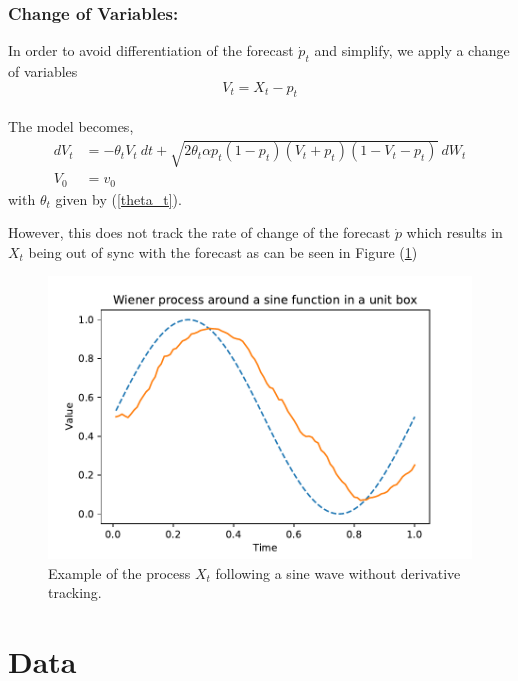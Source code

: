 \documentclass[10pt,twocolumn,letterpaper]{article}
\begin{document}
\subsubsection*{Change of Variables:}
In order to avoid differentiation of the forecast $\dot{p}_t$ and simplify, we apply a change of variables $$V_t = X_t - p_t$$  \\
The  model becomes,
\begin{equation}
\begin{split}
dV_t &=  - \theta_t V_t \  dt + \sqrt{2 \theta_t \alpha p_t(1-p_t) (V_t +p_t ) (1-V_t-p_t)} \  dW_t  \\ %
V_0 & = v_0
\end{split}\label{main}
\end{equation}
with $\theta_t$ given by (\ref{theta_t}).










However, this does not track the rate of change of the forecast $\dot{p}$ which  results in $X_t$ being out of sync with the forecast  as can be seen in Figure (\ref{sine_wave_shift})

\begin{figure}[t]
\begin{center}
   \includegraphics[width=0.8\linewidth]{conv_sine_shift.pdf}
\end{center}
   \caption{Example of the process $X_t$ following a sine wave without derivative tracking.}
\label{fig:long}
\label{fig:onecol}
\label{sine_wave_shift}
\end{figure}


\section{Data}
\end{document}

